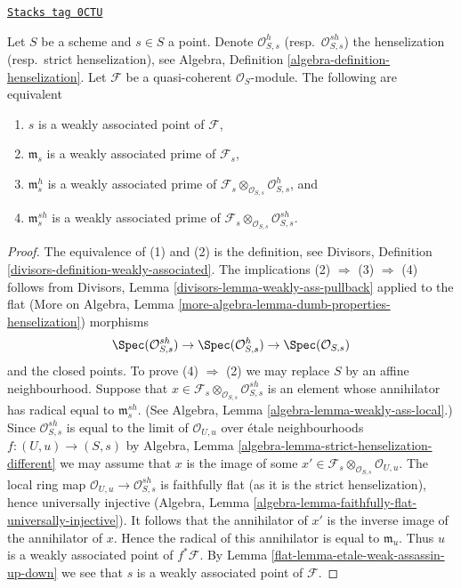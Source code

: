 \begin{lemma}
\label{flat-lemma-weakly-associated-henselization}
\href{https://stacks.math.columbia.edu/tag/0CTU}{\texttt{Stacks tag 0CTU}}

Let $S$ be a scheme and $s \in S$ a point. Denote $\mathcal{O}_{S, s}^h$
(resp.\ $\mathcal{O}_{S, s}^{sh}$) the henselization (resp.\ strict
henselization), see
Algebra, Definition \ref{algebra-definition-henselization}.
Let $\mathcal{F}$ be a quasi-coherent $\mathcal{O}_S$-module.
The following are equivalent
\begin{enumerate}
\item $s$ is a weakly associated point of $\mathcal{F}$,
\item $\mathfrak m_s$ is a weakly associated prime of $\mathcal{F}_s$,
\item $\mathfrak m_s^h$ is a weakly associated prime of
$\mathcal{F}_s \otimes_{\mathcal{O}_{S, s}} \mathcal{O}_{S, s}^h$, and
\item $\mathfrak m_s^{sh}$ is a weakly associated prime of
$\mathcal{F}_s \otimes_{\mathcal{O}_{S, s}} \mathcal{O}_{S, s}^{sh}$.
\end{enumerate}
\end{lemma}

\begin{proof}

The equivalence of (1) and (2) is the definition, see
Divisors, Definition \ref{divisors-definition-weakly-associated}.
The implications (2) $\Rightarrow$ (3) $\Rightarrow$ (4)
follows from Divisors, Lemma \ref{divisors-lemma-weakly-ass-pullback}
applied to the flat (More on Algebra, Lemma
\ref{more-algebra-lemma-dumb-properties-henselization})
morphisms
$$
\Spec(\mathcal{O}_{S, s}^{sh}) \to
\Spec(\mathcal{O}_{S, s}^h) \to
\Spec(\mathcal{O}_{S, s})
$$
and the closed points. To prove (4) $\Rightarrow$ (2) we may replace
$S$ by an affine neighbourhood. Suppose that
$x \in \mathcal{F}_s \otimes_{\mathcal{O}_{S, s}} \mathcal{O}_{S, s}^{sh}$
is an element whose annihilator has radical equal to $\mathfrak m_s^{sh}$.
(See Algebra, Lemma \ref{algebra-lemma-weakly-ass-local}.)
Since $\mathcal{O}_{S, s}^{sh}$ is equal to the limit
of $\mathcal{O}_{U, u}$ over \'etale neighbourhoods
$f : (U, u) \to (S, s)$ by Algebra, Lemma
\ref{algebra-lemma-strict-henselization-different}
we may assume that $x$ is the image of some
$x' \in \mathcal{F}_s \otimes_{\mathcal{O}_{S, s}} \mathcal{O}_{U, u}$.
The local ring map $\mathcal{O}_{U, u} \to \mathcal{O}_{S, s}^{sh}$
is faithfully flat (as it is the strict henselization), hence
universally injective
(Algebra, Lemma \ref{algebra-lemma-faithfully-flat-universally-injective}).
It follows that the annihilator of $x'$ is the inverse image of the
annihilator of $x$. Hence the radical of this annihilator
is equal to $\mathfrak m_u$.
Thus $u$ is a weakly associated point of $f^*\mathcal{F}$.
By Lemma \ref{flat-lemma-etale-weak-assassin-up-down}
we see that $s$ is a weakly associated point of $\mathcal{F}$.
\end{proof}

